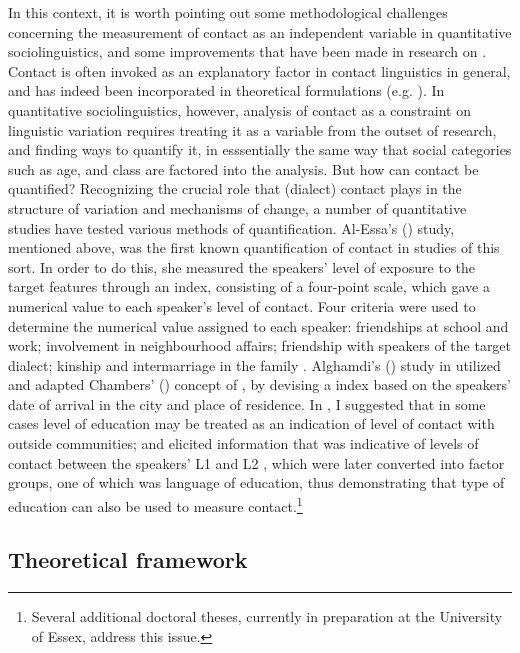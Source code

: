 \documentclass[output=paper]{langsci/langscibook}
\begin{document}
In this context, it is worth pointing out some methodological challenges concerning the measurement of contact as an independent variable in quantitative sociolinguistics, and some improvements that have been made in research on . Contact is often invoked as an explanatory factor in contact linguistics in general, and has indeed been incorporated in theoretical formulations (e.g. \citealt{ThomasonKaufman1988}). In quantitative sociolinguistics, however, analysis of contact as a constraint on linguistic variation requires treating it as a variable from the outset of research, and finding ways to quantify it, in esssentially the same way that social categories such as age,  and class are factored into the analysis. But how can contact be quantified? Recognizing the crucial role that (dialect) contact plays in the structure of variation and mechanisms of change, a number of quantitative studies have tested various methods of quantification. Al-Essa's (\citeyear{Al-Essa2009}) study, mentioned above, was the first known quantification of contact in studies of this sort. In order to do this, she measured the speakers’ level of exposure to the target features through an index, consisting of a four-point scale, which gave a numerical value to each speaker’s level of contact. Four criteria were used to determine the numerical value assigned to each speaker: friendships at school and work; involvement in neighbourhood affairs; friendship with speakers of the target dialect; kinship and intermarriage in the family \citep[208]{Al-Essa2009}. Alghamdi's (\citeyear{Alghamdi2014}) study in  utilized and adapted Chambers' (\citeyear{Chambers2000}) concept of , by devising a  index based on the speakers’ date of arrival in the city and place of residence. In \citet{Al-Wer2002}, I suggested that in some cases level of education may be treated as an indication of level of contact with outside communities; and \citet{Horesh2014} elicited information that was indicative of levels of contact between the speakers’ L1  and L2 , which were later converted into factor groups, one of which was language of education, thus demonstrating that type of education can also be used to measure contact.\footnote{Several additional doctoral theses, currently in preparation at the University of Essex, address this issue.}

\subsection{Theoretical framework}
\end{document}
